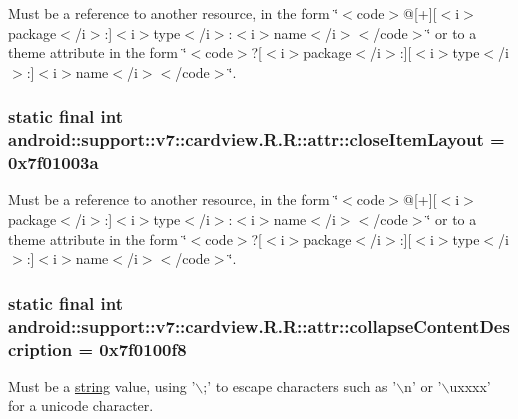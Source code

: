 Must be a reference to another resource, in the form \char`\"{}$<$code$>$@\mbox{[}+\mbox{]}\mbox{[}$<$i$>$package$<$/i$>$:\mbox{]}$<$i$>$type$<$/i$>$:$<$i$>$name$<$/i$>$$<$/code$>$\char`\"{} or to a theme attribute in the form \char`\"{}$<$code$>$?\mbox{[}$<$i$>$package$<$/i$>$:\mbox{]}\mbox{[}$<$i$>$type$<$/i$>$:\mbox{]}$<$i$>$name$<$/i$>$$<$/code$>$\char`\"{}. \hypertarget{classandroid_1_1support_1_1v7_1_1cardview_1_1_r_1_1attr_1ad4c0e393f0c9e7d47f39828055da0c}{
\subsubsection[{closeItemLayout}]{\setlength{\rightskip}{0pt plus 5cm}static final int android::support::v7::cardview.R.R::attr::closeItemLayout = 0x7f01003a}}
\label{classandroid_1_1support_1_1v7_1_1cardview_1_1_r_1_1attr_1ad4c0e393f0c9e7d47f39828055da0c}


Must be a reference to another resource, in the form \char`\"{}$<$code$>$@\mbox{[}+\mbox{]}\mbox{[}$<$i$>$package$<$/i$>$:\mbox{]}$<$i$>$type$<$/i$>$:$<$i$>$name$<$/i$>$$<$/code$>$\char`\"{} or to a theme attribute in the form \char`\"{}$<$code$>$?\mbox{[}$<$i$>$package$<$/i$>$:\mbox{]}\mbox{[}$<$i$>$type$<$/i$>$:\mbox{]}$<$i$>$name$<$/i$>$$<$/code$>$\char`\"{}. \hypertarget{classandroid_1_1support_1_1v7_1_1cardview_1_1_r_1_1attr_39700ed3911f5eb54176f7a1f569c5c1}{
\subsubsection[{collapseContentDescription}]{\setlength{\rightskip}{0pt plus 5cm}static final int android::support::v7::cardview.R.R::attr::collapseContentDescription = 0x7f0100f8}}
\label{classandroid_1_1support_1_1v7_1_1cardview_1_1_r_1_1attr_39700ed3911f5eb54176f7a1f569c5c1}


Must be a \hyperlink{classandroid_1_1support_1_1v7_1_1cardview_1_1_r_1_1string}{string} value, using '$\backslash$;' to escape characters such as '$\backslash$n' or '$\backslash$uxxxx' for a unicode character. 

